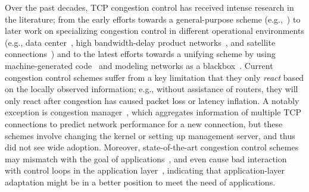 Over the past decades, TCP congestion control has received intense 
research in the literature; from the early efforts towards a 
general-purpose scheme 
(e.g.,~\cite{jacobson1988congestion,brakmo1994tcp,tcp-compound})
to later work on specializing congestion control in different operational
environments (e.g., data center~\cite{alizadeh2010data},
high bandwidth-delay product networks~\cite{cubic}, and satellite 
connections~\cite{tcp-hybla})
and to the latest efforts towards a unifying scheme by using 
machine-generated code~\cite{remy} and modeling networks 
as a blackbox~\cite{pcc}.
Current congestion control schemes suffer from a key
limitation that they only {\em react} based on the locally observed
information; e.g., without assistance of routers, they will only
react after congestion has caused packet loss or latency inflation.
A notably exception is congestion 
manager~\cite{balakrishnan1999integrated,spand},
which aggregates information of multiple TCP connections to 
predict network performance for a new connection, but these
schemes involve changing the kernel or setting up management 
server, and thus did not see wide adoption.
Moreover, state-of-the-art congestion control schemes may 
mismatch with the goal of applications~\cite{usenix12_ghobadi},
and even cause bad interaction with control loops in 
the application layer~\cite{confused,festive}, indicating that
application-layer adaptation might be in a better position to meet
the need of applications.

